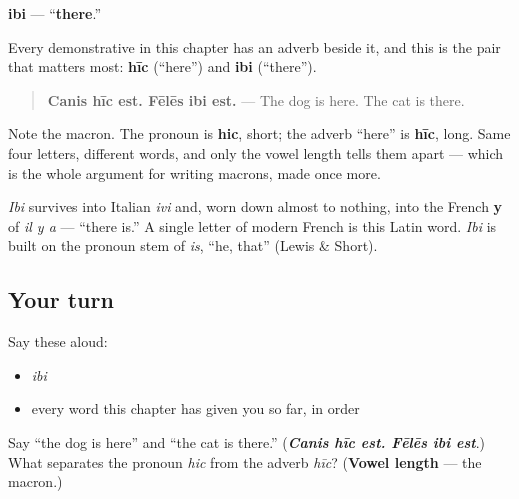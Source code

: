 \begin{cousinweb}
\textbf{ibi} — \textquotedblleft{}\textbf{there}.\textquotedblright{}

Every demonstrative in this chapter has an adverb beside it, and this is the pair that matters most: \textbf{hīc} (\textquotedblleft{}here\textquotedblright{}) and \textbf{ibi} (\textquotedblleft{}there\textquotedblright{}).

\begin{quote}
\textbf{Canis hīc est. Fēlēs ibi est.} — The dog is here. The cat is there.
\end{quote}

Note the macron. The pronoun is \textbf{hic}, short; the adverb \textquotedblleft{}here\textquotedblright{} is \textbf{hīc}, long. Same four letters, different words, and only the vowel length tells them apart — which is the whole argument for writing macrons, made once more.

\emph{Ibi} survives into Italian \emph{ivi} and, worn down almost to nothing, into the French \textbf{y} of \emph{il y a} — \textquotedblleft{}there is.\textquotedblright{} A single letter of modern French is this Latin word. \emph{Ibi} is built on the pronoun stem of \emph{is}, \textquotedblleft{}he, that\textquotedblright{} (Lewis \& Short).
\end{cousinweb}

\subsection*{Your turn}
Say these aloud:

\begin{itemize}
\raggedright
  \item \emph{ibi}
  \item every word this chapter has given you so far, in order
\end{itemize}

\begin{tcolorbox}[breakable,colback=teal!4,colframe=teal!35!black,title={Before you move on}]
Say \textquotedblleft{}the dog is here\textquotedblright{} and \textquotedblleft{}the cat is there.\textquotedblright{} (\emph{\textbf{Canis hīc est. Fēlēs ibi est}}.) What separates the pronoun \emph{hic} from the adverb \emph{hīc}? (\textbf{Vowel length} — the macron.)
\end{tcolorbox}
